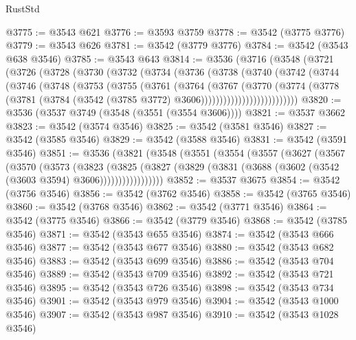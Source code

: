 \begin{lexlean}{RustStd}
\begin{coremodule}
@3775 := @3543 @621
@3776 := @3593 @3759
@3778 := @3542 (@3775 @3776)
@3779 := @3543 @626
@3781 := @3542 (@3779 @3776)
@3784 := @3542 (@3543 @638 @3546)
@3785 := @3543 @643
@3814 := @3536
    (@3716
      (@3548
        (@3721
          (@3726
            (@3728
              (@3730
                (@3732
                  (@3734
                    (@3736
                      (@3738
                        (@3740
                          (@3742
                            (@3744
                              (@3746
                                (@3748
                                  (@3753
                                    (@3755
                                      (@3761
                                        (@3764
                                          (@3767
                                            (@3770
                                              (@3774
                                                (@3778
                                                  (@3781
                                                    (@3784
                                                      (@3542
                                                        (@3785 @3772)
                                                        @3606))))))))))))))))))))))))))
@3820 := @3536 (@3537 @3749 (@3548 (@3551 (@3554 @3606))))
@3821 := @3537 @3662
@3823 := @3542 (@3574 @3546)
@3825 := @3542 (@3581 @3546)
@3827 := @3542 (@3585 @3546)
@3829 := @3542 (@3588 @3546)
@3831 := @3542 (@3591 @3546)
@3851 := @3536
    (@3821
      (@3548
        (@3551
          (@3554
            (@3557
              (@3627
                (@3567
                  (@3570
                    (@3573
                      (@3823
                        (@3825
                          (@3827
                            (@3829 (@3831 (@3688 (@3602 (@3542 (@3603 @3594) @3606)))))))))))))))))
@3852 := @3537 @3675
@3854 := @3542 (@3756 @3546)
@3856 := @3542 (@3762 @3546)
@3858 := @3542 (@3765 @3546)
@3860 := @3542 (@3768 @3546)
@3862 := @3542 (@3771 @3546)
@3864 := @3542 (@3775 @3546)
@3866 := @3542 (@3779 @3546)
@3868 := @3542 (@3785 @3546)
@3871 := @3542 (@3543 @655 @3546)
@3874 := @3542 (@3543 @666 @3546)
@3877 := @3542 (@3543 @677 @3546)
@3880 := @3542 (@3543 @682 @3546)
@3883 := @3542 (@3543 @699 @3546)
@3886 := @3542 (@3543 @704 @3546)
@3889 := @3542 (@3543 @709 @3546)
@3892 := @3542 (@3543 @721 @3546)
@3895 := @3542 (@3543 @726 @3546)
@3898 := @3542 (@3543 @734 @3546)
@3901 := @3542 (@3543 @979 @3546)
@3904 := @3542 (@3543 @1000 @3546)
@3907 := @3542 (@3543 @987 @3546)
@3910 := @3542 (@3543 @1028 @3546)

\end{coremodule}
\end{lexlean}
